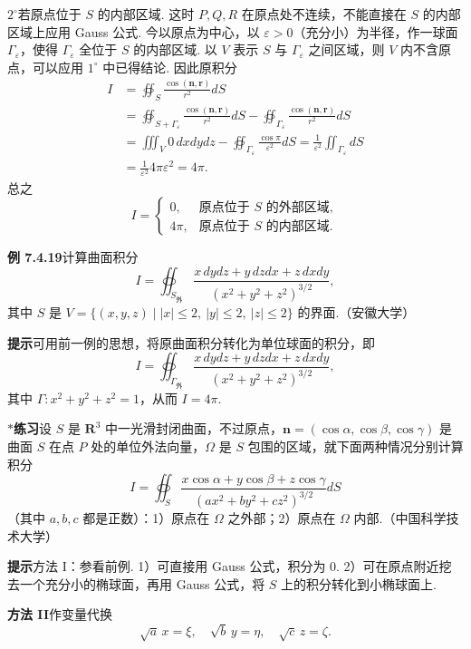\documentclass[UTF8, 12pt, fontset=fandol, oneside]{ctexart}
\begin{document}
\noindent\textbf{$2^\circ$}\quad 若原点位于 $S$ 的内部区域. 这时 $P,Q,R$ 在原点处不连续，不能直接在 $S$ 的内部区域上应用 Gauss 公式. 今以原点为中心，以 $\varepsilon>0$（充分小）为半径，作一球面 $\Gamma_\varepsilon$，使得 $\Gamma_\varepsilon$ 全位于 $S$ 的内部区域. 以 $V$ 表示 $S$ 与 $\Gamma_\varepsilon$ 之间区域，则 $V$ 内不含原点，可以应用 $1^\circ$ 中已得结论. 因此原积分
\[
\begin{aligned}
I&=\oiint_S\frac{\cos(\mathbf n,\mathbf r)}{r^2}dS\\
&=\oiint_{S+\Gamma_\varepsilon}\frac{\cos(\mathbf n,\mathbf r)}{r^2}dS
-\oiint_{\Gamma_\varepsilon}\frac{\cos(\mathbf n,\mathbf r)}{r^2}dS\\
&=\iiint_V0\,dxdydz-\oiint_{\Gamma_\varepsilon}\frac{\cos\pi}{\varepsilon^2}dS
=\frac1{\varepsilon^2}\iint_{\Gamma_\varepsilon}dS\\
&=\frac1{\varepsilon^2}4\pi\varepsilon^2=4\pi.
\end{aligned}
\]
总之
\[
I=\begin{cases}
0, & \text{原点位于 $S$ 的外部区域},\\
4\pi, & \text{原点位于 $S$ 的内部区域}.
\end{cases}
\]

\noindent\textbf{例 7.4.19}\quad 计算曲面积分
\[
I=\oiint_{S_{\text{外}}}\frac{x\,dydz+y\,dzdx+z\,dxdy}{(x^2+y^2+z^2)^{3/2}},
\]
其中 $S$ 是 $V=\{(x,y,z)\mid |x|\le2,\ |y|\le2,\ |z|\le2\}$ 的界面.（安徽大学）

\noindent\textbf{提示}\quad 可用前一例的思想，将原曲面积分转化为单位球面的积分，即
\[
I=\oiint_{\Gamma_{\text{外}}}\frac{x\,dydz+y\,dzdx+z\,dxdy}{(x^2+y^2+z^2)^{3/2}},
\]
其中 $\Gamma:x^2+y^2+z^2=1$，从而 $I=4\pi$.

\noindent\textbf{$*$练习}\quad 设 $S$ 是 $\mathbf R^3$ 中一光滑封闭曲面，不过原点，$\mathbf n=(\cos\alpha,\cos\beta,\cos\gamma)$ 是曲面 $S$ 在点 $P$ 处的单位外法向量，$\Omega$ 是 $S$ 包围的区域，就下面两种情况分别计算积分
\[
I=\oiint_S\frac{x\cos\alpha+y\cos\beta+z\cos\gamma}{(ax^2+by^2+cz^2)^{3/2}}dS \tag{1}
\]
（其中 $a,b,c$ 都是正数）：1）原点在 $\Omega$ 之外部；2）原点在 $\Omega$ 内部.（中国科学技术大学）

\noindent\textbf{提示}\quad 方法 I：参看前例. 1）可直接用 Gauss 公式，积分为 0. 2）可在原点附近挖去一个充分小的椭球面，再用 Gauss 公式，将 $S$ 上的积分转化到小椭球面上.

\noindent\textbf{方法 II}\quad 作变量代换
\[
\sqrt a\,x=\xi,\quad \sqrt b\,y=\eta,\quad \sqrt c\,z=\zeta.
\]
\end{document}
